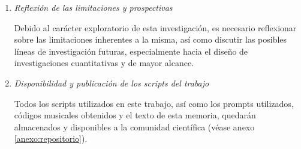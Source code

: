 \begin{enumerate}

    \item \emph{Reflexión de las limitaciones y prospectivas}

    Debido al carácter exploratorio de esta investigación, es necesario reflexionar sobre las limitaciones inherentes a la misma, así como discutir las posibles líneas de investigación futuras, especialmente hacia el diseño de investigaciones cuantitativas y de mayor \mbox{alcance}.

    \item \emph{Disponibilidad y publicación de los scripts del trabajo}

    Todos los scripts utilizados en este trabajo, así como los prompts utilizados, códigos musicales obtenidos y el texto de esta memoria, quedarán almacenados y disponibles a la comunidad científica (véase anexo \ref{anexo:repositorio}).

\end{enumerate}
